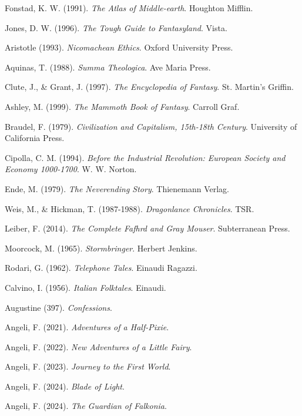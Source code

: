 Fonstad, K. W. (1991).
\textit{The Atlas of Middle-earth}.
Houghton Mifflin.

Jones, D. W. (1996).
\textit{The Tough Guide to Fantasyland}.
Vista.

Aristotle (1993).
\textit{Nicomachean Ethics}.
Oxford University Press.

Aquinas, T. (1988).
\textit{Summa Theologica}.
Ave Maria Press.

Clute, J., \& Grant, J. (1997).
\textit{The Encyclopedia of Fantasy}.
St. Martin's Griffin.

Ashley, M. (1999).
\textit{The Mammoth Book of Fantasy}.
Carroll Graf.

Braudel, F. (1979).
\textit{Civilization and Capitalism, 15th-18th Century}.
University of California Press.

Cipolla, C. M. (1994).
\textit{Before the Industrial Revolution: European Society and Economy 1000-1700}.
W. W. Norton.

Ende, M. (1979).
\textit{The Neverending Story}.
Thienemann Verlag.

Weis, M., \& Hickman, T. (1987-1988).
\textit{Dragonlance Chronicles}.
TSR.

Leiber, F. (2014).
\textit{The Complete Fafhrd and Gray Mouser}.
Subterranean Press.

Moorcock, M. (1965).
\textit{Stormbringer}.
Herbert Jenkins.

Rodari, G. (1962).
\textit{Telephone Tales}.
Einaudi Ragazzi.

Calvino, I. (1956).
\textit{Italian Folktales}.
Einaudi.

Augustine (397).
\textit{Confessions}.

Angeli, F. (2021).
\textit{Adventures of a Half-Pixie}.

Angeli, F. (2022).
\textit{New Adventures of a Little Fairy}.

Angeli, F. (2023).
\textit{Journey to the First World}.

Angeli, F. (2024).
\textit{Blade of Light}.

Angeli, F. (2024).
\textit{The Guardian of Falkonia}.
